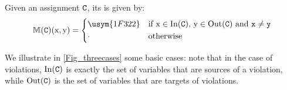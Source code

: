 \documentclass[conference]{IEEEtran}
\newcommand{\vi}{\usym{1F322}} %
\newcommand{\nv}{\cdot} %
\begin{document}
\begin{definition}[Assignment]
	Given an assignment \(\mathtt{C}\), its \SFM is given by:
	\[
	\sfm{C}(\textnormal{\prc|x|},\textnormal{\prc|y|})=
	  \begin{dcases*}
		\vi &  if $\textnormal{\prc|x|} \in \In(\comm{C})$, $\textnormal{\prc|y|} \in \Out(\comm{C})$ and $\comm{x} \neq \comm{y}$\\
		\nv & otherwise
	\end{dcases*}
\]
\end{definition}

We illustrate in \autoref{Fig_threecases} some basic cases: %
note that in the case of violations, $\operatorname{In}(\mathtt{C})$ is exactly the set of variables that are sources of a violation,
while $\operatorname{Out}(\mathtt{C})$ is the set of variables that are targets of violations.
\end{document}
